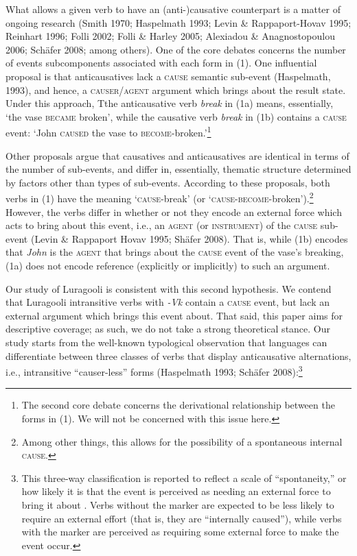 \documentclass[output=paper]{langsci/langscibook}
\begin{document}
What allows a given verb to have an (anti-)causative counterpart is a matter of ongoing research (Smith 1970; Haspelmath 1993; Levin \& Rappaport-Hovav 1995; Reinhart 1996; Folli 2002; Folli \& Harley 2005; Alexiadou \& Anagnostopoulou 2006; Schäfer 2008; among others). One of the core debates concerns the number of events subcomponents associated with each form in (1). One influential proposal is that anticausatives lack a \textsc{cause} semantic sub-event (Haspelmath, 1993), and hence, a \textsc{causer/agent} argument which brings about the result state. Under this approach, Tthe anticausative verb \textit{break} in (1a) means, essentially, ‘the vase \textsc{became} broken’, while the causative verb \textit{break} in (1b) contains a \textsc{cause} event: ‘John \textsc{caused} the vase to \textsc{become}{}-broken.’\footnote{The second core debate concerns the derivational relationship between the forms in (1). We will not be concerned with this issue here.}

Other proposals argue that causatives and anticausatives are identical in terms of the number of sub-events, and differ in, essentially, thematic structure determined by factors other than types of sub-events. According to these proposals, both verbs in (1) have the meaning ‘\textsc{cause}{}-break’ (or ‘\textsc{cause-become}{}-broken’).\footnote{ Among other things, this allows for the possibility of a spontaneous internal \textsc{cause.}} However, the verbs differ in whether or not they encode an external force which acts to bring about this event, i.e., an \textsc{agent (}or \textsc{instrument}) of the \textsc{cause} sub-event (Levin \& Rappaport Hovav 1995; Shäfer 2008). That is, while (1b) encodes that \textit{John }is the\textsc{ agent} that brings about the \textsc{cause} event of the vase’s breaking, (1a) does not encode reference (explicitly or implicitly) to such an argument. 

  Our study of Luragooli is consistent with this second hypothesis. We contend that Luragooli intransitive verbs with \textit{{}-Vk} contain a \textsc{cause} event, but lack an external argument which brings this event about. That said, this paper aims for descriptive coverage; as such, we do not take a strong theoretical stance. Our study starts from the well-known typological observation that languages can differentiate between three classes of verbs that display anticausative alternations, i.e., intransitive “causer-less” forms (Haspelmath 1993; Schäfer 2008):\footnote{ This three-way classification is reported to reflect a scale of “spontaneity,” or how likely it is that the event is perceived as needing an external force to bring it about \citep{Haspelmath1993}. Verbs without the marker are expected to be less likely to require an external effort (that is, they are “internally caused”), while verbs with the marker are perceived as requiring some external force to make the event occur. }
\end{document}
